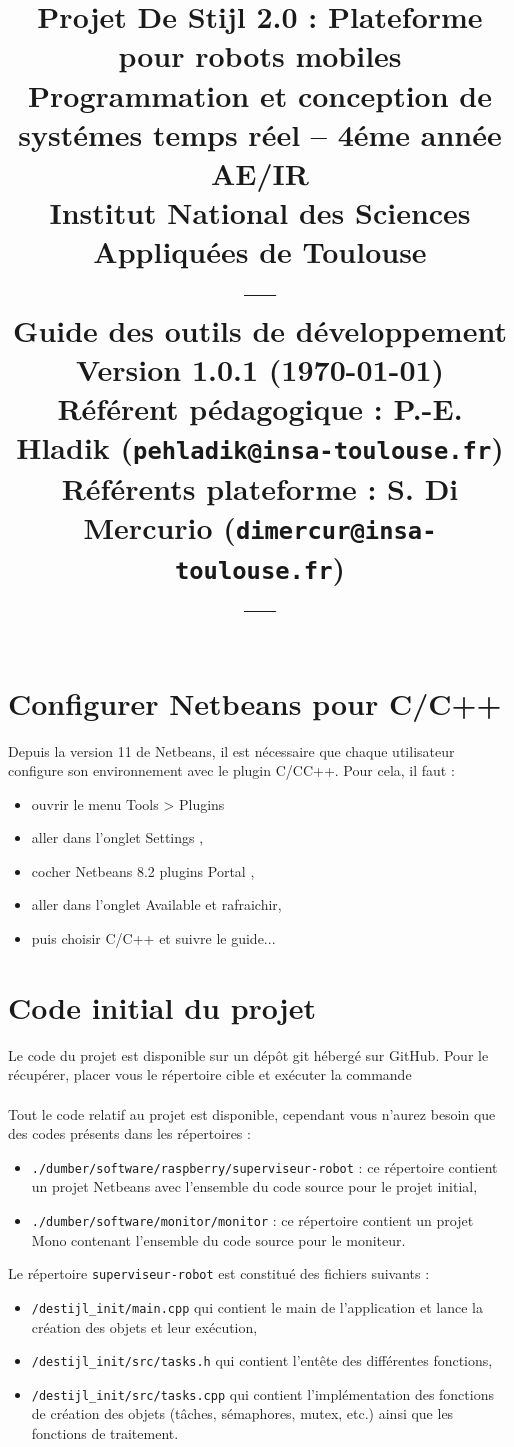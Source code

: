 \documentclass[11pt]{paper}
\title{{\Huge Projet De Stijl 2.0}
{\small : Plateforme pour robots mobiles}\\
{\scriptsize Programmation et conception de systémes temps réel -- 4éme année AE/IR}\\
{\scriptsize Institut National des Sciences Appliquées de Toulouse}\\
---\\
Guide des outils de développement \\
{\large Version 1.0.1 (\today)}\\
{\scriptsize Référent pédagogique : P.-E. Hladik (\texttt{pehladik@insa-toulouse.fr})}\\
{\scriptsize Référents plateforme : S. Di Mercurio (\texttt{dimercur@insa-toulouse.fr})}\\
---
}
\begin{document}
\maketitle

\section{Configurer Netbeans pour C/C++}
\label{sec:git}

Depuis la version 11 de Netbeans, il est nécessaire que chaque utilisateur configure son environnement avec le plugin C/CC++. Pour cela, il faut :
\begin{itemize}
	\item ouvrir le menu \og Tools > Plugins \fg
	\item aller dans l'onglet \og Settings \fg,
	\item cocher  \og Netbeans 8.2 plugins Portal \fg,
	\item aller dans l'onglet \og Available \fg et rafraichir,
	\item puis choisir C/C++ et suivre le guide...
\end{itemize}

\section{Code initial du projet}
\label{sec:git}

Le code du projet est disponible sur un dépôt git hébergé sur GitHub. Pour le récupérer, placer vous le répertoire cible et exécuter la commande\\ \indent{}\\

Tout le code relatif au projet est disponible, cependant vous n'aurez besoin que des codes présents dans les répertoires :
\begin{itemize}
	\item {\tt ./dumber/software/raspberry/superviseur-robot} : ce répertoire contient un projet Netbeans avec l'ensemble du code source pour le projet initial,
	\item {\tt ./dumber/software/monitor/monitor} : ce répertoire contient un projet Mono contenant l'ensemble du code source pour le moniteur.\\
\end{itemize}

Le répertoire {\tt superviseur-robot} est constitué des fichiers suivants :
\begin{itemize}
\item {\tt /destijl\_init/main.cpp} qui contient le main de l'application et lance la création des objets et leur exécution,
\item {\tt /destijl\_init/src/tasks.h} qui contient l'entête des différentes fonctions,
\item {\tt /destijl\_init/src/tasks.cpp} qui contient l'implémentation des fonctions de création des objets (tâches, sémaphores, mutex, etc.) ainsi que les fonctions de traitement.
\end{itemize}
\end{document}
